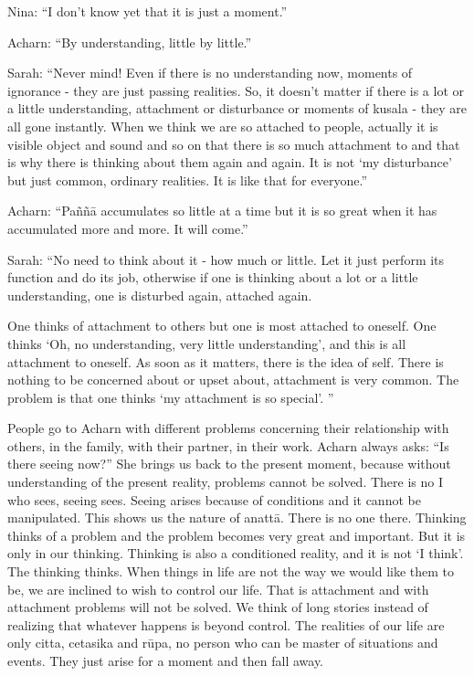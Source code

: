 Nina: ``I don't know yet that it is just a moment.'' 

Acharn: ``By understanding, little by little.'' 

Sarah: ``Never mind! Even if there is no understanding now, moments of ignorance - they are just passing realities. So, it doesn't matter if there is a lot or a 
little understanding, attachment or disturbance or moments of kusala - they are 
all gone instantly. When we think we are so attached to people, actually it is visible object and sound and so on that there is so much attachment to and that is 
why there is thinking about them again and again. It is not `my disturbance' but 
just common, ordinary realities. It is like that for everyone.'' 

Acharn: ``Paññā accumulates so little at a time but it is so great when it has accumulated more and more. It will come.'' 

Sarah: ``No need to think about it - how much or little. Let it just perform its 
function and do its job, otherwise if one is thinking about a lot or a little understanding, one is disturbed again, attached again. 

One thinks of attachment to others but one is most attached to oneself. One 
thinks `Oh, no understanding, very little understanding', and this is all attachment to oneself. As soon as it matters, there is the idea of self. There is nothing 
to be concerned about or upset about, attachment is very common. The problem 
is that one thinks `my attachment is so special'. '' 

People go to Acharn with different problems concerning their relationship with 
others, in the family, with their partner, in their work. Acharn always asks: ``Is 
there seeing now?'' She brings us back to the present moment, because without understanding of the present reality, problems cannot be solved. There is no I 
who sees, seeing sees. Seeing arises because of conditions and it cannot be manipulated. This shows us the nature of anattā. There is no one there. Thinking 
thinks of a problem and the problem becomes very great and important. But it is 
only in our thinking. Thinking is also a conditioned reality, and it is not `I 
think'. The thinking thinks. When things in life are not the way we would like 
them to be, we are inclined to wish to control our life. That is attachment and 
with attachment problems will not be solved. We think of long stories instead of 
realizing that whatever happens is beyond control. The realities of our life are 
only citta, cetasika and rūpa, no person who can be master of situations and 
events. They just arise for a moment and then fall away. 

